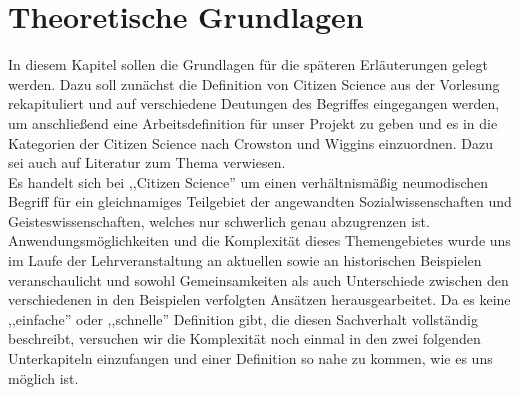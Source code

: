 \documentclass{article}
\begin{document}
\section{Theoretische Grundlagen}
In diesem Kapitel sollen die Grundlagen für die späteren Erläuterungen gelegt werden. Dazu soll zunächst die Definition von Citizen Science aus der Vorlesung rekapituliert und auf verschiedene Deutungen des Begriffes eingegangen werden, um anschließend eine Arbeitsdefinition für unser Projekt zu geben und es in die Kategorien der Citizen Science nach  Crowston und Wiggins einzuordnen. Dazu sei auch auf Literatur zum Thema verwiesen.\\
Es handelt sich bei ,,Citizen Science'' um einen verhältnismäßig neumodischen Begriff für ein gleichnamiges Teilgebiet der angewandten Sozialwissenschaften und Geisteswissenschaften, welches nur schwerlich genau abzugrenzen ist. Anwendungsmöglichkeiten und die Komplexität dieses Themengebietes wurde uns im Laufe der Lehrveranstaltung an aktuellen sowie an historischen Beispielen veranschaulicht und sowohl Gemeinsamkeiten als auch Unterschiede zwischen den verschiedenen in den Beispielen verfolgten Ansätzen herausgearbeitet. Da es keine ,,einfache'' oder ,,schnelle'' Definition gibt, die diesen Sachverhalt vollständig beschreibt, versuchen wir die Komplexität noch einmal in den zwei folgenden Unterkapiteln einzufangen und einer Definition so nahe zu kommen, wie es uns möglich ist.
\end{document}
